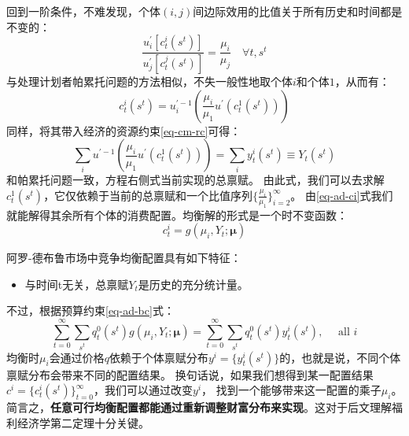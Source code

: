 回到一阶条件，不难发现，个体$(i,j)$间边际效用的比值关于所有历史和时间都是不变的：
\begin{equation}
    \frac{u_i^{\prime}\left[c_t^i\left(s^t\right)\right]}{u_j^{\prime}\left[c_t^j\left(s^t\right)\right]}=\frac{\mu_i}{\mu_j}
        \quad \forall t, s^t
\end{equation}
与处理计划者帕累托问题的方法相似，不失一般性地取个体$i$和个体$1$，从而有：
\begin{equation}    \label{eq-ad-ci}
    c_t^i\left(s^t\right)=u_i^{\prime-1}\left(\frac{\mu_i}{\mu_1} u^{\prime}\left(c_t^1\left(s^t\right)\right)\right)
\end{equation}
同样，将其带入经济的资源约束\ref{eq-cm-rc}可得：
\begin{equation}    \label{eq-ad-c1}
    \sum_i u^{\prime-1}\left(\frac{\mu_i}{\mu_1} u^{\prime}\left(c_t^1\left(s^t\right)\right)\right)=\sum_i y_t^i\left(s^t\right)
        \equiv Y_t\left(s^t\right)
\end{equation}
和帕累托问题一致，方程右侧式当前实现的总禀赋。
由此式，我们可以去求解$c_t^1\left(s^t\right)$，它仅依赖于当前的总禀赋和一个比值序列$\{\frac{\mu_i}{\mu_1}\}_{i=2}^{\infty}$。
由\ref{eq-ad-ci}式我们就能解得其余所有个体的消费配置。均衡解的形式是一个时不变函数：
\begin{equation*}
    c_t^i=g\left(\mu_i, Y_t ; \boldsymbol{\mu}\right)
\end{equation*}

\begin{property}
    阿罗-德布鲁市场中竞争均衡配置具有如下特征：
    \begin{itemize}
        \item 与时间t无关，总禀赋$Y_t$是历史的充分统计量。
    \end{itemize}
\end{property}

不过，根据预算约束\ref{eq-ad-bc}式：
\begin{equation*}
    \sum_{t=0}^{\infty} \sum_{s^t} q_t^0\left(s^t\right) g\left(\mu_i, Y_t ; \boldsymbol{\mu}\right)
        =\sum_{t=0}^{\infty} \sum_{s^t} q_t^0\left(s^t\right) y_t^i\left(s^t\right), \quad \text { all } i
\end{equation*}
均衡时$\mu_i$会通过价格$q$依赖于个体禀赋分布$y^i=\{y_t^i\left(s^t\right)\}$的，也就是说，不同个体禀赋分布会带来不同的配置结果。
换句话说，如果我们想得到某一配置结果$c^i=\{c_t^i\left(s^t\right)\}_{t=0}^{\infty}$，我们可以通过改变$y^i$，
找到一个能够带来这一配置的乘子$\mu_i$。简言之，\textbf{任意可行均衡配置都能通过重新调整财富分布来实现}。这对于后文理解福利经济学第二定理十分关键。


